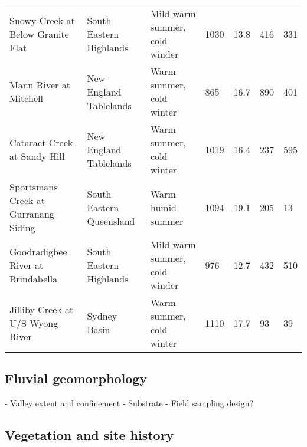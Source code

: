 \begin{table}[]
\begin{tabular}{lllllll}
Snowy Creek at Below Granite Flat      & South Eastern Highlands  & Mild-warm summer, cold winder & 1030                      & 13.8                         & 416                          & 331               \\
Mann River at Mitchell                 & New England Tablelands   & Warm summer, cold winter      & 865                       & 16.7                         & 890                          & 401               \\
Cataract Creek at Sandy Hill           & New England Tablelands   & Warm summer, cold winter      & 1019                      & 16.4                         & 237                          & 595               \\
Sportsmans Creek at Gurranang Siding   & South Eastern Queensland & Warm humid summer             & 1094                      & 19.1                         & 205                          & 13                \\
Goodradigbee River at Brindabella      & South Eastern Highlands  & Mild-warm summer, cold winder & 976                       & 12.7                         & 432                          & 510               \\
Jilliby Creek at U/S Wyong River       & Sydney Basin             & Warm summer, cold winter      & 1110                      & 17.7                         & 93                           & 39               
\end{tabular}
\end{table}


\subsection{Fluvial geomorphology}

-	Valley extent and confinement
-	Substrate
-	Field sampling design?


\subsection{Vegetation and site history}



